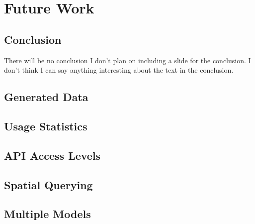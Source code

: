 \section{Future Work}
\subsection{Conclusion}
\begin{frame}{There will be no conclusion}
I don't plan on including a slide for the conclusion.
I don't think I can say anything interesting about the text in the conclusion.
\end{frame}

\subsection{Generated Data}
\subsection{Usage Statistics}
\subsection{API Access Levels}
\subsection{Spatial Querying}
\subsection{Multiple Models}
